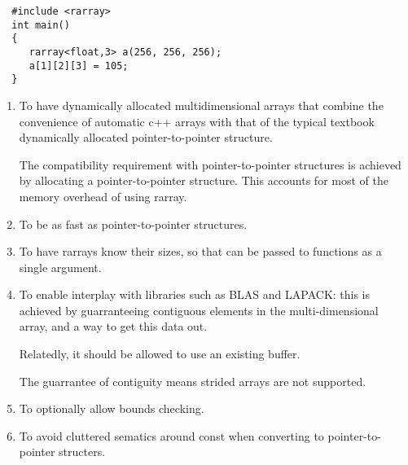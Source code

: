\documentclass[11pt,twoside]{article}
\begin{document}
\begin{framed}\vspace{-14pt}%
\begin{verbatim}
  #include <rarray>
  int main() 
  {
     rarray<float,3> a(256, 256, 256);
     a[1][2][3] = 105;
  }
\end{verbatim}%
\vspace{-14pt}%
\end{framed}


\begin{enumerate}\itemsep1pt\parskip3pt
 
\item To have dynamically allocated multidimensional arrays that
combine the convenience of automatic c++ arrays with that of the
typical textbook dynamically allocated pointer-to-pointer
structure. 

The compatibility requirement with pointer-to-pointer structures
is achieved by allocating a pointer-to-pointer structure. This
accounts for most of the memory overhead of using rarray.

\item To be as fast as pointer-to-pointer structures.

\item To have rarrays know their sizes, so that can be passed to
functions as a single argument. 

\item To enable interplay with libraries such as BLAS and LAPACK: this
  is achieved by guarranteeing contiguous elements in the
  multi-dimensional array, and a way to get this data out.

Relatedly, it should be allowed to use an existing buffer.
    
The guarrantee of contiguity means strided arrays are not supported.

\item To optionally allow bounds checking.

\item To avoid cluttered sematics around const when converting to  pointer-to-pointer structers.
\end{enumerate}
\end{document}
